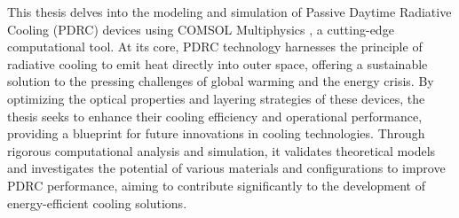 
This thesis delves into the modeling and simulation of Passive Daytime Radiative Cooling (PDRC) devices using COMSOL Multiphysics \texttrademark, a cutting-edge computational tool. At its core, PDRC technology harnesses the principle of radiative cooling to emit heat directly into outer space, offering a sustainable solution to the pressing challenges of global warming and the energy crisis. By optimizing the optical properties and layering strategies of these devices, the thesis seeks to enhance their cooling efficiency and operational performance, providing a blueprint for future innovations in cooling technologies. Through rigorous computational analysis and simulation, it validates theoretical models and investigates the potential of various materials and configurations to improve PDRC performance, aiming to contribute significantly to the development of energy-efficient cooling solutions.